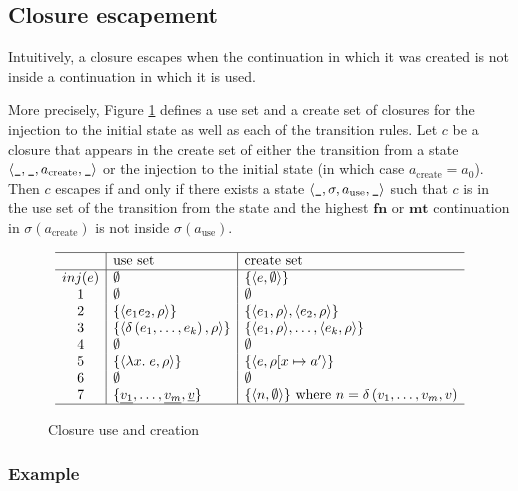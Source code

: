 \RequirePackage[hyphens]{url}\documentclass[12pt,oneside]{amsart}
\newcommand{\kw}[1]{\mathbf{#1}}
\newcommand{\lmd}[2]{\lambda #1.\;#2}
\begin{document}
\subsection{Closure escapement}

Intuitively, a closure escapes when the continuation in which it was created is not inside a continuation in which it is used.

More precisely, Figure \ref{fig:creation} defines a use set and a create set of closures for the injection to the initial state as well as each of the transition rules.  Let $c$ be a closure that appears in the create set of either the transition from a state $\langle\verb|_|, \verb|_|, a_\text{create}, \verb|_|\rangle$ or the injection to the initial state (in which case $a_\text{create} = a_0$).  Then $c$ escapes if and only if there exists a state $\langle\verb|_|, \sigma, a_\text{use}, \verb|_|\rangle$ such that $c$ is in the use set of the transition from the state and the highest $\kw{fn}$ or $\kw{mt}$ continuation in $\sigma\left(a_\text{create}\right)$ is not inside $\sigma\left(a_\text{use}\right)$.

\begin{figure}[hbpt]
\[\begin{array}{c|l|l}\hline
  & \text{use set} & \text{create set} \\ \hline
inj(e) & \emptyset & \{\langle e, \emptyset\rangle\} \\
1 & \emptyset & \emptyset \\
2 & \{\langle e_1e_2, \rho\rangle\} &
    \{\langle e_1, \rho\rangle, \langle e_2, \rho\rangle\} \\
3 & \{\langle \delta\left(e_1, \ldots, e_k\right), \rho\rangle\} &
    \{\langle e_1, \rho\rangle, \ldots, \langle e_k, \rho\rangle\} \\
4 & \emptyset & \emptyset \\
5 & \{\langle\lmd{x}{e}, \rho\rangle\} &
    \{\langle e, \rho[x\mapsto a^\prime\rangle\} \\
6 & \emptyset & \emptyset \\
7 & \{\underline{v_1}, \ldots, \underline{v_m}, \underline{v}\} &
    \{\langle n, \emptyset\rangle\} \text{ where $n = \delta\left(v_1, \ldots, v_m, v\right)$} \\ \hline
\end{array}\]
\caption{Closure use and creation}
\label{fig:creation}
\end{figure}

\subsubsection{Example}
\end{document}
